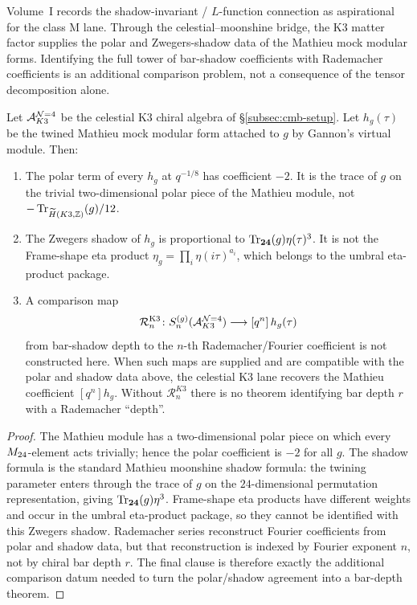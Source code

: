 Volume~I records the shadow-invariant / $L$-function connection as
aspirational for the class M lane. Through the celestial--moonshine
bridge, the K3 matter factor supplies the polar and Zwegers-shadow data
of the Mathieu mock modular forms. Identifying the full tower of
bar-shadow coefficients with Rademacher coefficients is an additional
comparison problem, not a consequence of the tensor decomposition alone.

\begin{theorem}
\label{thm:shadow-tower-moonshine}
Let $\mathcal A^{\mathcal{N}{=}4}_{K3}$ be the celestial K3 chiral algebra of
\S\ref{subsec:cmb-setup}. Let \(h_g(\tau)\) be the twined Mathieu mock
modular form attached to \(g\) by Gannon's virtual module. Then:
\begin{enumerate}[label=\textup{(\roman*)}]
\item The polar term of every \(h_g\) at \(q^{-1/8}\) has coefficient
\(-2\). It is the trace of \(g\) on the trivial two-dimensional polar
piece of the Mathieu module, not \(-\operatorname{Tr}_{\widetilde H(K3,\mathbb Z)}(g)/12\).
\item The Zwegers shadow of \(h_g\) is proportional to
\(\operatorname{Tr}_{\mathbf{24}}(g)\eta(\tau)^3\). It is not the Frame-shape eta
product \(\eta_g=\prod_i\eta(i\tau)^{a_i}\), which belongs to the
umbral eta-product package.
\item A comparison map
\[
\mathcal R_n^{\mathrm{K3}}\colon
S_n^{(g)}(\mathcal A^{\mathcal{N}{=}4}_{K3})
\longrightarrow [q^n]\,h_g(\tau)
\]
from bar-shadow depth to the \(n\)-th Rademacher/Fourier coefficient is
not constructed here. When such maps are supplied and are compatible
with the polar and shadow data above, the celestial K3 lane recovers
the Mathieu coefficient \([q^n]h_g\). Without \(\mathcal R_n^{K3}\)
there is no theorem identifying bar depth \(r\) with a Rademacher
``depth''.
\end{enumerate}
\end{theorem}

\begin{proof}
The Mathieu module has a two-dimensional polar piece on which every
\(M_{24}\)-element acts trivially; hence the polar coefficient is
\(-2\) for all \(g\). The shadow formula is the standard Mathieu
moonshine shadow formula: the twining parameter enters through the
trace of \(g\) on the \(24\)-dimensional permutation representation,
giving \(\operatorname{Tr}_{\mathbf{24}}(g)\eta^3\). Frame-shape eta products have
different weights and occur in the umbral eta-product package, so they
cannot be identified with this Zwegers shadow. Rademacher series
reconstruct Fourier coefficients from polar and shadow data, but that
reconstruction is indexed by Fourier exponent \(n\), not by chiral bar
depth \(r\). The final clause is therefore exactly the additional
comparison datum needed to turn the polar/shadow agreement into a
bar-depth theorem.
\end{proof}

